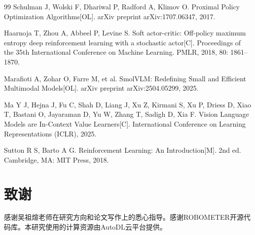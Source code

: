 \begin{thebibliography}{99}
Schulman J, Wolski F, Dhariwal P, Radford A, Klimov O.
Proximal Policy Optimization Algorithms[OL].
arXiv preprint arXiv:1707.06347, 2017.

Haarnoja T, Zhou A, Abbeel P, Levine S.
Soft actor-critic: Off-policy maximum entropy deep reinforcement learning with a stochastic actor[C].
Proceedings of the 35th International Conference on Machine Learning. PMLR, 2018, 80: 1861--1870.

Marafioti A, Zohar O, Farre M, et al.
SmolVLM: Redefining Small and Efficient Multimodal Models[OL].
arXiv preprint arXiv:2504.05299, 2025.

Ma Y J, Hejna J, Fu C, Shah D, Liang J, Xu Z, Kirmani S, Xu P, Driess D, Xiao T, Bastani O, Jayaraman D, Yu W, Zhang T, Sadigh D, Xia F.
Vision Language Models are In-Context Value Learners[C].
International Conference on Learning Representations (ICLR), 2025.

Sutton R S, Barto A G.
Reinforcement Learning: An Introduction[M].
2nd ed. Cambridge, MA: MIT Press, 2018.


\end{thebibliography}



\clearpage
\section*{致谢}

感谢吴祖煊老师在研究方向和论文写作上的悉心指导。感谢ROBOMETER\cite{robometer2026}开源代码库。本研究使用的计算资源由AutoDL云平台提供。




